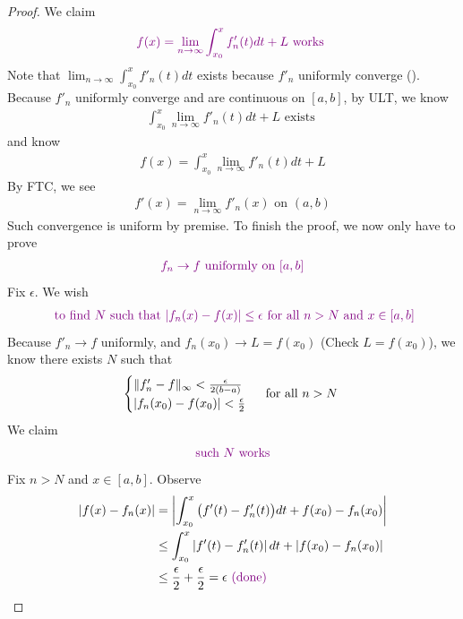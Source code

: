 \documentclass{report}
\begin{document}
\begin{proof}
We claim 
\begin{align*}
  \textcolor{violet}{f(x)=\lim_{n\to \infty}\int_{x_0}^x f'_n(t)dt+L\text{ works }} 
\end{align*}
Note that $\lim_{n\to \infty}\int_{x_0}^x f'_n(t)dt$ exists because $f'_n$ uniformly converge  ().\\

Because $f'_n$ uniformly converge and are continuous on $[a,b]$, by ULT, we know
 \begin{align*}
\int_{x_0}^x \lim_{n\to \infty}f'_n(t)dt+L\text{ exists }
\end{align*}
and know 
\begin{align*}
f(x)=\int_{x_0}^x \lim_{n\to \infty}f'_n(t)dt + L 
\end{align*}
By FTC, we see
 \begin{align*}
f'(x)=\lim_{n\to \infty}f'_n(x)\text{ on }(a,b)
\end{align*}
Such convergence is uniform by premise. To finish the proof, we now only have to prove 
\begin{align*}
\textcolor{violet}{f_n\to f\text{ uniformly on }[a,b]}
\end{align*}
Fix $\epsilon $. We wish 
\begin{align*}
\textcolor{violet}{\text{ to find $N$ such that  $\left|f_n(x)-f(x)\right|\leq \epsilon $ for all $n>N$ and  $x \in [a,b]$}}
\end{align*}
Because $f'_n \to f$ uniformly, and $f_n(x_0) \to L=f(x_0)$ (Check $L=f(x_0)$), we know there exists $N$ such that 
 \begin{align*}
\begin{cases}
  \| f'_n-f \|_\infty < \frac{\epsilon }{2(b-a)}\\
  \left|f_n(x_0)-f(x_0)\right|<\frac{\epsilon}{2}
\end{cases}\text{ for all $n>N$ }
\end{align*}
We claim 
\begin{align*}
\textcolor{violet}{\text{ such $N$ works }}
\end{align*}
Fix $n>N$ and  $x\in [a,b]$. Observe 
\begin{align*}
\left|f(x)-f_n(x)\right|&= \left|\int_{x_0}^x \big(f'(t)-f'_n(t) \big)dt+f(x_0)-f_n(x_0)\right|\\
&\leq \int_{x_0}^x \left|f'(t)-f'_n(t)\right|dt+ \left|f(x_0)-f_n(x_0)\right|\\
&\leq \frac{\epsilon}{2}+\frac{\epsilon}{2}=\epsilon \textcolor{violet}{\text{ (done) }}
\end{align*}
\end{proof}
\end{document}
